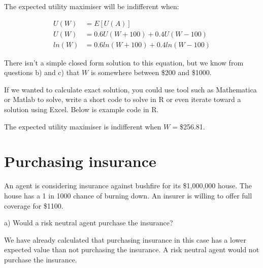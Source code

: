 \documentclass[
  letterpaper,
  DIV=11,
  numbers=noendperiod]{scrreprt}
\begin{document}
\begin{tcolorbox}[enhanced jigsaw, title=\textcolor{quarto-callout-tip-color}{\faLightbulb}\hspace{0.5em}{Answer}, toprule=.15mm, colback=white, breakable, titlerule=0mm, colframe=quarto-callout-tip-color-frame, coltitle=black, opacityback=0, rightrule=.15mm, colbacktitle=quarto-callout-tip-color!10!white, bottomtitle=1mm, opacitybacktitle=0.6, arc=.35mm, bottomrule=.15mm, toptitle=1mm, leftrule=.75mm, left=2mm]

The expected utility maximiser will be indifferent when:

\begin{align*}
U(W)&=E[U(A)] \\
U(W)&=0.6U(W+100)+0.4U(W-100) \\
ln(W)&=0.6ln(W+100)+0.4ln(W-100)
\end{align*}

There isn't a simple closed form solution to this equation, but we know
from questions b) and c) that \(W\) is somewhere between \$200 and
\$1000.

If we wanted to calculate exact solution, you could use tool such as
Mathematica or Matlab to solve, write a short code to solve in R or even
iterate toward a solution using Excel. Below is example code in R.

The expected utility maximiser is indifferent when \(W=\)\$256.81.

\end{tcolorbox}

\hypertarget{purchasing-insurance}{%
\section{Purchasing insurance}\label{purchasing-insurance}}

An agent is considering insurance against bushfire for its \$1,000,000
house. The house has a 1 in 1000 chance of burning down. An insurer is
willing to offer full coverage for \$1100.

a) Would a risk neutral agent purchase the insurance?

\begin{tcolorbox}[enhanced jigsaw, title=\textcolor{quarto-callout-tip-color}{\faLightbulb}\hspace{0.5em}{Answer}, toprule=.15mm, colback=white, breakable, titlerule=0mm, colframe=quarto-callout-tip-color-frame, coltitle=black, opacityback=0, rightrule=.15mm, colbacktitle=quarto-callout-tip-color!10!white, bottomtitle=1mm, opacitybacktitle=0.6, arc=.35mm, bottomrule=.15mm, toptitle=1mm, leftrule=.75mm, left=2mm]

We have already calculated that purchasing insurance in this case has a
lower expected value than not purchasing the insurance. A risk neutral
agent would not purchase the insurance.

\end{tcolorbox}
\end{document}
